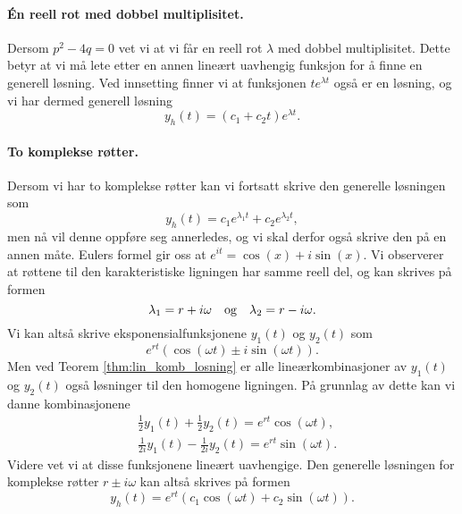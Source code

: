 \documentclass{article}
\theoremstyle{definition}
\theoremstyle{remark}
\begin{document}
\begin{multicols*}{2}
\paragraph*{Én reell rot med dobbel multiplisitet.} Dersom $p^2 - 4q = 0$ vet vi at vi får en reell rot $\lambda$ med dobbel multiplisitet. Dette betyr at vi må lete etter en annen lineært uavhengig funksjon for å finne en generell løsning. Ved innsetting finner vi at funksjonen $te^{\lambda t}$ også er en løsning, og vi har dermed generell løsning
\begin{equation*}
  y_h(t) = (c_1 + c_2 t) e^{\lambda t}.
\end{equation*}

\paragraph*{To komplekse røtter.} Dersom vi har to komplekse røtter kan vi fortsatt skrive den generelle løsningen som
\begin{equation*}
  y_h(t) = c_1 e^{\lambda_1 t} + c_2 e^{\lambda_2 t},
\end{equation*}
men nå vil denne oppføre seg annerledes, og vi skal derfor også skrive den på en annen måte. Eulers formel gir oss at $e^{i t} = \cos(x) + i \sin(x)$. Vi observerer at røttene til den karakteristiske ligningen har samme reell del, og kan skrives på formen
\begin{equation*}
  \lambda_1 = r + i \omega \ \ \textnormal{ og }\ \ \lambda_2 = r - i \omega.
\end{equation*}
Vi kan altså skrive eksponensialfunksjonene $y_1(t)$ og $y_2(t)$ som
\begin{equation*}
  e^{rt} (\cos(\omega t) \pm i \sin(\omega t)).
\end{equation*}
Men ved Teorem \ref{thm:lin_komb_losning} er alle lineærkombinasjoner av $y_1(t)$ og $y_2(t)$ også løsninger til den homogene ligningen. På grunnlag av dette kan vi danne kombinasjonene 
\begin{equation*}
  \begin{split}
    & \frac{1}{2}y_1(t) + \frac{1}{2} y_2(t) = e^{r t} \cos(\omega t), \\
    & \frac{1}{2i}y_1(t) - \frac{1}{2i} y_2(t) = e^{r t} \sin(\omega t).
  \end{split}
\end{equation*}
Videre vet vi at disse funksjonene
lineært uavhengige. Den generelle løsningen for komplekse røtter $r \pm i \omega$ kan altså skrives på formen
\begin{equation*}
  y_h(t) = e^{r t} (c_1 \cos(\omega t) + c_2 \sin(\omega t)).
\end{equation*}


\end{multicols*}
\end{document}
